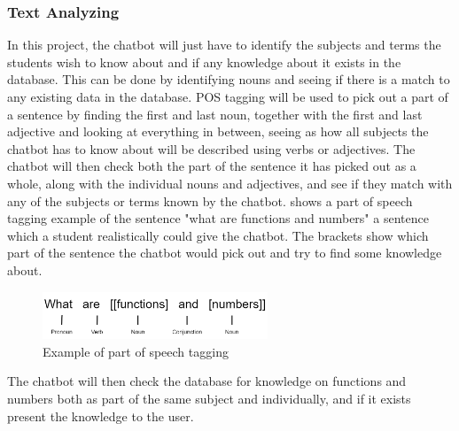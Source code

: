 \subsubsection{Text Analyzing}

In this project, the chatbot will just have to identify the subjects and terms the students wish to know about and if any knowledge about it exists in the database. This can be done by identifying nouns and seeing if there is a match to any existing data in the database.
POS tagging will be used to pick out a part of a sentence by finding the first and last noun, together with the first and last adjective and looking at everything in between, seeing as how all subjects the chatbot has to know about will be described using verbs or adjectives. The chatbot will then check both the part of the sentence it has picked out as a whole, along with the individual nouns and adjectives, and see if they match with any of the subjects or terms known by the chatbot.  shows a part of speech tagging example of the sentence "what are functions and numbers" a sentence which a student realistically could give the chatbot. The brackets show which part of the sentence the chatbot would pick out and try to find some knowledge about.

\begin{figure}[H]
    \centering
    \includegraphics[width=0.6\textwidth]{figures/NLP_example2.png}
    \caption{Example of part of speech tagging}
    \label{fig:NLP_example2}
\end{figure}

\noindent
The chatbot will then check the database for knowledge on functions and numbers both as part of the same subject and individually, and if it exists present the knowledge to the user.

